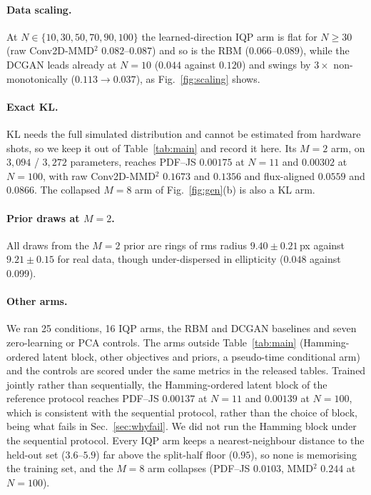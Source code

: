 \documentclass{article}
\begin{document}
\paragraph{Data scaling.} At $N \in \{10,30,50,70,90,100\}$ the learned-direction IQP arm is flat for
$N \geq 30$ (raw Conv2D-MMD$^2$ $0.082$--$0.087$) and so is the RBM ($0.066$--$0.089$), while the
DCGAN leads already at $N{=}10$ ($0.044$ against $0.120$) and swings by $3\times$
non-monotonically ($0.113 \to 0.037$), as Fig.~\ref{fig:scaling} shows.

\paragraph{Exact KL.} KL needs the full simulated distribution and cannot be estimated from
hardware shots, so we keep it out of Table~\ref{tab:main} and record it here. Its $M{=}2$ arm, on
$3{,}094$ / $3{,}272$ parameters, reaches PDF--JS $0.00175$ at $N{=}11$ and $0.00302$ at $N{=}100$,
with raw Conv2D-MMD$^2$ $0.1673$ and $0.1356$ and flux-aligned $0.0559$ and $0.0866$. The collapsed
$M{=}8$ arm of Fig.~\ref{fig:gen}(b) is also a KL arm.

\paragraph{Prior draws at $M{=}2$.} All draws from the $M{=}2$ prior are rings of rms radius
$9.40 \pm 0.21$\,px against $9.21 \pm 0.15$ for real data, though under-dispersed in ellipticity
($0.048$ against $0.099$).

\paragraph{Other arms.} We ran 25 conditions, 16 IQP arms, the RBM and DCGAN baselines and seven
zero-learning or PCA controls. The arms outside Table~\ref{tab:main} (Hamming-ordered latent block,
other objectives and priors, a pseudo-time conditional arm) and the controls are scored under the
same metrics in the released tables. Trained jointly rather than sequentially, the Hamming-ordered
latent block of the reference protocol reaches PDF--JS $0.00137$ at $N{=}11$ and $0.00139$ at
$N{=}100$, which is consistent with the sequential protocol, rather than the choice of block, being
what fails in Sec.~\ref{sec:whyfail}. We did not run the Hamming block under the sequential
protocol. Every IQP arm keeps a
nearest-neighbour distance to the held-out set ($3.6$--$5.9$) far above the split-half floor ($0.95$),
so none is memorising the training set, and the $M{=}8$ arm collapses (PDF--JS $0.0103$, MMD$^2$
$0.244$ at $N{=}100$).
\end{document}
